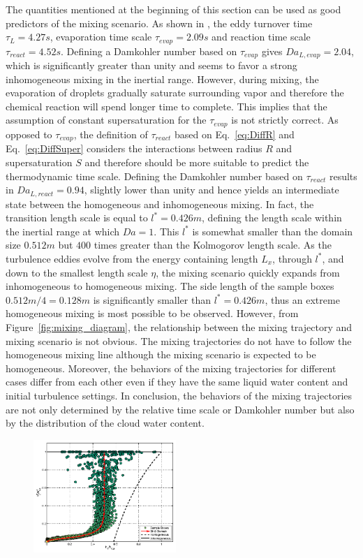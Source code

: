 \documentclass[draft,jgrga]{AGUTeX}
\newcommand{\Eq}[1]{Eq.~\eqref{#1}} \newcommand{\Fig}[1]{Figure~\ref{#1}}
\begin{document}
\begin{article}
The quantities mentioned at the beginning of this section can be used as good predictors of the mixing scenario. As shown in , the eddy turnover time $\tau_L = 4.27s$, evaporation time scale $\tau_{evap} = 2.09s$ and reaction time scale $\tau_{react} = 4.52s$. Defining a Damkohler number based on $\tau_{evap}$ gives $Da_{L,evap} = 2.04$, which is significantly greater than unity and seems to favor a strong inhomogeneous mixing in the inertial range. However, during mixing, the evaporation of droplets gradually saturate surrounding vapor and therefore the chemical reaction will spend longer time to complete. This implies that the assumption of constant supersaturation for the $\tau_{evap}$ is not strictly correct. 
As opposed to $\tau_{evap}$, the definition of $\tau_{react}$ based on \Eq{eq:DiffR} and \Eq{eq:DiffSuper} considers the interactions between radius $R$ and supersaturation $S$ and therefore should be more suitable to predict the thermodynamic time scale. Defining the Damkohler number based on $\tau_{react}$ results in $Da_{L,react} = 0.94$, slightly lower than unity and hence yields an intermediate state between the homogeneous and inhomogeneous mixing. In fact, the transition length scale is equal to $l^{*} = 0.426m$, defining the length scale within the inertial range at which $Da = 1$. This $l^*$ is somewhat smaller than the domain size $0.512m$ but $400$ times greater than the Kolmogorov length scale. As the turbulence eddies evolve from the energy containing length $L_x$, through $l^*$, and down to the smallest length scale $\eta$, the mixing scenario quickly expands from inhomogeneous to homogeneous mixing. The side length of the sample boxes $0.512m/4 = 0.128 m$ is significantly smaller than $l^* = 0.426m$, thus an extreme homogeneous mixing is most possible to be observed. However, from \Fig{fig:mixing_diagram}, the relationship between the mixing trajectory and mixing scenario is not obvious. The mixing trajectories do not have to follow the homogeneous mixing line although the mixing scenario is expected to be homogeneous. Moreover, the behaviors of the mixing trajectories for different cases differ from each other even if they have the same liquid water content and initial turbulence settings. In conclusion, the behaviors of the mixing trajectories are not only determined by the relative time scale or Damkohler number but also by the distribution of the cloud water content. 
\begin{figure}\centering
\includegraphics[width=0.48\textwidth]{Figures/mixing_cased1}

\end{figure}
\end{article}
\end{document}
